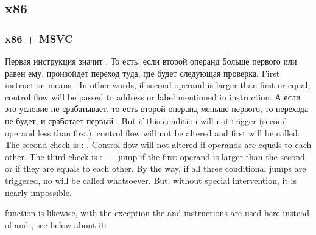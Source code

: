 \subsection{x86}

\subsubsection{x86 + MSVC}




\IFRU
{Первая инструкция \JLE значит . То есть, если второй операнд больше первого или 
равен ему, произойдет переход туда, где будет следующая проверка.}
{First instruction \JLE means . In other words, if second operand is 
larger than first or equal, control flow will be passed to address or label mentioned in instruction.}
\IFRU
{А если это условие не срабатывает, то есть второй операнд меньше первого, то перехода не будет, 
и сработает первый \printf.}
{But if this condition will not trigger (second operand less than first), control flow will 
not be altered and first \printf will be called.}
{The second check is \JNE: . Control flow will not altered if operands are 
equals to each other.}
{The third check is \JGE: ~---jump if the first operand is larger 
than the second or if they are equals to each other.}
{By the way, if all three conditional jumps are triggered, no \printf will be called whatsoever. 
But, without special intervention, it is nearly impossible.}

 
{function is likewise, with the exception the \JBE and \JAE instructions
are used here instead of 
\JLE and \JGE, see below about it:}

